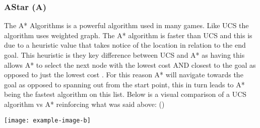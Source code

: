 \subsubsection{AStar (A\*)}
The A* Algorithms is a powerful algorithm used in many games. Like UCS the algorithm uses weighted graph. The A* algorithm is faster than UCS and this is due to a heuristic value that takes notice of the location in relation to the end goal. This heuristic is they key difference between UCS and A* as having this allows A* to select the next node with the lowest cost AND closest to the goal as opposed to just the lowest cost \citetemp. For this reason A* will navigate towards the goal as opposed to spanning out from the start point, this in turn leads to A* being the fastest algorithm on this list. 
Below is a visual comparison of a UCS algorithm vs A* reinforcing what was said above: (\cite{majumder_2013_a})
\begin{center}
	\texttt{[image: example-image-b]}
\end{center}


